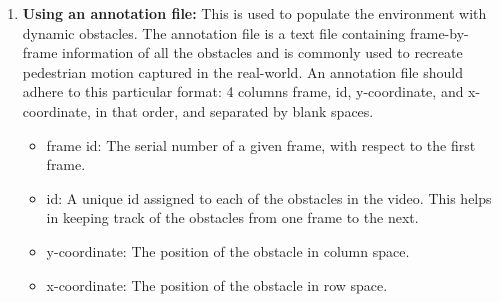 \begin{enumerate}
\item \textbf{Using an annotation file:}
This is used to populate the environment with dynamic obstacles. The annotation file is a text file containing frame-by-frame information of all the obstacles and is commonly used to recreate pedestrian motion captured in the real-world. An annotation file should adhere to this particular format: 4 columns frame, id, y-coordinate, and x-coordinate, in that order, and separated by blank spaces.
\begin{itemize}
    \item frame id: The serial number of a given frame, with respect to the first frame.
    \item id: A unique id assigned to each of the obstacles in the video. This helps in keeping track of the obstacles from one frame to the next.
    \item y-coordinate: The position of the obstacle in column space.
    \item x-coordinate: The position of the obstacle in row space.
\end{itemize}



\end{enumerate}

